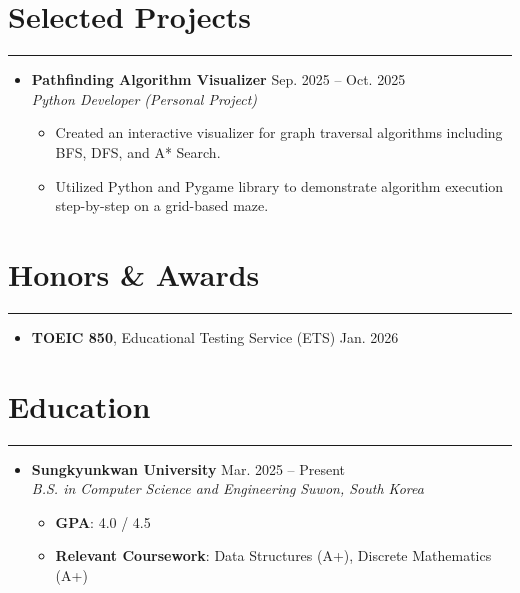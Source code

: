 \documentclass[letterpaper, 10pt]{article}
\begin{document}
\section*{Selected Projects}
\hrule
\vspace{4pt}
\begin{itemize}
    \item
    \textbf{Pathfinding Algorithm Visualizer} \hfill Sep. 2025 -- Oct. 2025 \\
    \textit{Python Developer (Personal Project)}
    \begin{itemize}
        \item Created an interactive visualizer for graph traversal algorithms including BFS, DFS, and A* Search.
        \item Utilized Python and Pygame library to demonstrate algorithm execution step-by-step on a grid-based maze.
    \end{itemize}
\end{itemize}

\section*{Honors \& Awards}
\hrule
\vspace{4pt}
\begin{itemize}
    \item \textbf{TOEIC 850}, Educational Testing Service (ETS) \hfill Jan. 2026
\end{itemize}

\section*{Education}
\hrule
\vspace{4pt}
\begin{itemize}
    \item
    \textbf{Sungkyunkwan University} \hfill Mar. 2025 -- Present \\
    \textit{B.S. in Computer Science and Engineering} \hfill \textit{Suwon, South Korea}
    \begin{itemize}
        \item \textbf{GPA}: 4.0 / 4.5
        \item \textbf{Relevant Coursework}: Data Structures (A+), Discrete Mathematics (A+)
    \end{itemize}
\end{itemize}
\end{document}
